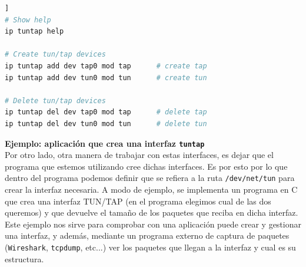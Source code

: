 \documentclass[12pt]{article}
\begin{document}
	\vspace{10px}

	\begin{lstlisting}[language=Bash, label=lst: ej2 tuntap ip, caption=Ejemplo de uso de \texttt{ip} para controlar interfaces TUN/TAP [\ref{bib: tunctl + ip}]]
# Show help
ip tuntap help

# Create tun/tap devices
ip tuntap add dev tap0 mod tap		# create tap
ip tuntap add dev tun0 mod tun		# create tun

# Delete tun/tap devices
ip tuntap del dev tap0 mod tap		# delete tap
ip tuntap del dev tun0 mod tun		# delete tun
	\end{lstlisting}

	\pagebreak
	
	\noindent \textbf{\large Ejemplo: aplicación que crea una interfaz \texttt{tuntap}}\\

	\noindent Por otro lado, otra manera de trabajar con estas interfaces, es dejar que el programa que estemos utilizando cree dichas interfaces. Es por esto por lo que dentro del programa podemos definir que se refiera a la ruta \texttt{/dev/net/tun} para crear la interfaz necesaria. A modo de ejemplo, se implementa un programa en C que crea una interfaz TUN/TAP (en el programa elegimos cual de las dos queremos) y que devuelve el tamaño de los paquetes que reciba en dicha interfaz. Este ejemplo nos sirve para comprobar con una aplicación puede crear y gestionar una interfaz, y además, mediante un programa externo de captura de paquetes (\texttt{Wireshark}, \texttt{tcpdump}, etc...) ver los paquetes que llegan a la interfaz y cual es su estructura. \\
	
\end{document}
